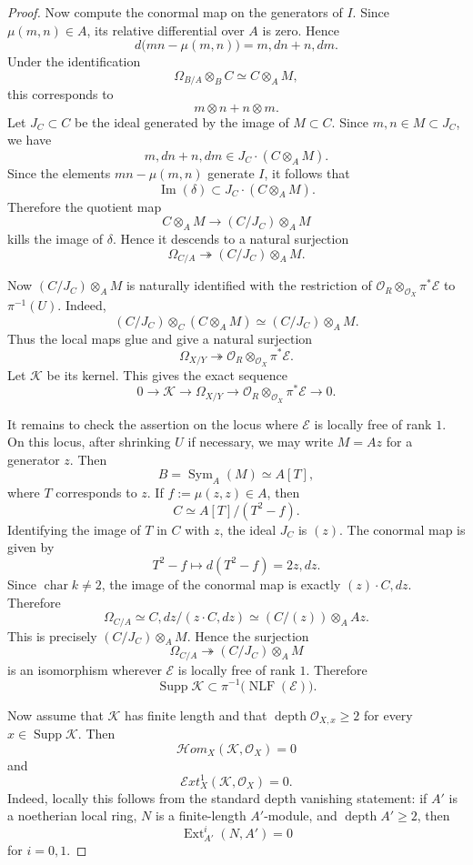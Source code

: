\documentclass[11pt,twoside]{amsart}
\theoremstyle{plain}
\numberwithin{equation}{section}
\theoremstyle{definition}
\begin{document}
\begin{proof}
Now compute the conormal map on the generators of $I$. Since $\mu(m,n)\in A$, its relative differential over $A$ is zero. Hence
$$
d\bigl(mn-\mu(m,n)\bigr)=m,dn+n,dm.
$$
Under the identification
$$
\Omega_{B/A}\otimes_B C\simeq C\otimes_A M,
$$
this corresponds to
$$
m\otimes n+n\otimes m.
$$
Let $J_C\subset C$ be the ideal generated by the image of $M\subset C$. Since $m,n\in M\subset J_C$, we have
$$
m,dn+n,dm\in J_C\cdot(C\otimes_A M).
$$
Since the elements $mn-\mu(m,n)$ generate $I$, it follows that
$$
\operatorname{Im}(\delta)\subset J_C\cdot(C\otimes_A M).
$$
Therefore the quotient map
$$
C\otimes_A M\longrightarrow (C/J_C)\otimes_A M
$$
kills the image of $\delta$. Hence it descends to a natural surjection
$$
\Omega_{C/A}\twoheadrightarrow (C/J_C)\otimes_A M.
$$

Now $(C/J_C)\otimes_A M$ is naturally identified with the restriction of $\mathcal{O}_R\otimes_{\mathcal{O}_X}\pi^*\mathcal{E}$ to $\pi^{-1}(U)$. Indeed,
$$
(C/J_C)\otimes_C(C\otimes_A M)\simeq (C/J_C)\otimes_A M.
$$
Thus the local maps glue and give a natural surjection
$$
\Omega_{X/Y}
\twoheadrightarrow
\mathcal{O}_R\otimes_{\mathcal{O}_X}\pi^*\mathcal{E}.
$$
Let $\mathcal{K}$ be its kernel. This gives the exact sequence
$$
0\longrightarrow\mathcal{K}\longrightarrow\Omega_{X/Y}
\longrightarrow
\mathcal{O}_R\otimes_{\mathcal{O}_X}\pi^*\mathcal{E}
\longrightarrow 0.
$$

It remains to check the assertion on the locus where $\mathcal{E}$ is locally free of rank $1$. On this locus, after shrinking $U$ if necessary, we may write $M=Az$ for a generator $z$. Then
$$
B=\operatorname{Sym}_A(M)\simeq A[T],
$$
where $T$ corresponds to $z$. If $f:=\mu(z,z)\in A$, then
$$
C\simeq A[T]/(T^2-f).
$$
Identifying the image of $T$ in $C$ with $z$, the ideal $J_C$ is $(z)$. The conormal map is given by
$$
T^2-f\longmapsto d(T^2-f)=2z,dz.
$$
Since $\operatorname{char}k\neq 2$, the image of the conormal map is exactly $(z)\cdot C,dz$. Therefore
$$
\Omega_{C/A}\simeq C,dz/(z\cdot C,dz)\simeq (C/(z))\otimes_A Az.
$$
This is precisely $(C/J_C)\otimes_A M$. Hence the surjection
$$
\Omega_{C/A}\twoheadrightarrow (C/J_C)\otimes_A M
$$
is an isomorphism wherever $\mathcal{E}$ is locally free of rank $1$. Therefore
$$
\operatorname{Supp}\mathcal{K}
\subset
\pi^{-1}\bigl(\operatorname{NLF}(\mathcal{E})\bigr).
$$

Now assume that $\mathcal{K}$ has finite length and that $\operatorname{depth}\mathcal{O}_{X,x}\geq 2$ for every $x\in\operatorname{Supp}\mathcal{K}$. Then
$$
\mathcal{H}om_X(\mathcal{K},\mathcal{O}_X)=0
$$
and
$$
\mathcal{E}xt_X^1(\mathcal{K},\mathcal{O}_X)=0.
$$
Indeed, locally this follows from the standard depth vanishing statement: if $A'$ is a noetherian local ring, $N$ is a finite-length $A'$-module, and $\operatorname{depth}A'\geq 2$, then
$$
\operatorname{Ext}_{A'}^i(N,A')=0
$$
for $i=0,1$.


\end{proof}
\end{document}
